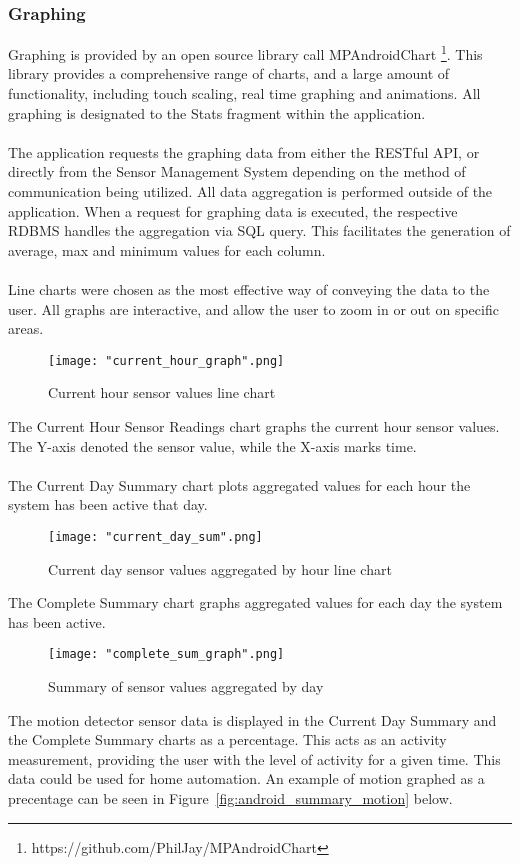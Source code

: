 \documentclass{article}
\begin{document}
\subsubsection{Graphing}
Graphing is provided by an open source library call MPAndroidChart \footnote{https://github.com/PhilJay/MPAndroidChart}. This library provides a comprehensive range of charts, and a large amount of functionality, including touch scaling, real time graphing and animations. All graphing is designated to the Stats fragment within the application.\\\\
The application requests the graphing data from either the RESTful API, or directly from the Sensor Management System depending on the method of communication being utilized. All data aggregation is performed outside of the application. When a request for graphing data is executed, the respective RDBMS handles the aggregation via SQL query. This facilitates the generation of average, max and minimum values for each column. \\\\
Line charts were chosen as the most effective way of conveying the data to the user. All graphs are interactive, and allow the user to zoom in or out on specific areas. 

\begin{figure}[H]
\centering
\texttt{[image: "current\_hour\_graph".png]}
\caption{Current hour sensor values line chart}
\label{fig:android_current_hour_chart}
\end{figure}

\noindent
The Current Hour Sensor Readings chart graphs the current hour sensor values. The Y-axis denoted the sensor value, while the X-axis marks time.\\\\
The Current Day Summary chart plots aggregated values for each hour the system has been active that day. 
\begin{figure}[H]
\centering
\texttt{[image: "current\_day\_sum".png]}
\caption{Current day sensor values aggregated by hour line chart}
\label{fig:android_current_day_chart}
\end{figure}
\noindent
The Complete Summary chart graphs aggregated values for each day the system has been active.

\begin{figure}[H]
\centering
\texttt{[image: "complete\_sum\_graph".png]}
\caption{Summary of sensor values aggregated by day}
\label{fig:android_current_day_chart}
\end{figure}
\noindent
The motion detector sensor data is displayed in the Current Day Summary and the Complete Summary charts as a percentage. This acts as an activity measurement, providing the user with the level of activity for a given time. This data could be used for home automation. An example of motion graphed as a precentage can be seen in Figure~\ref{fig:android_summary_motion} below.
\end{document}
